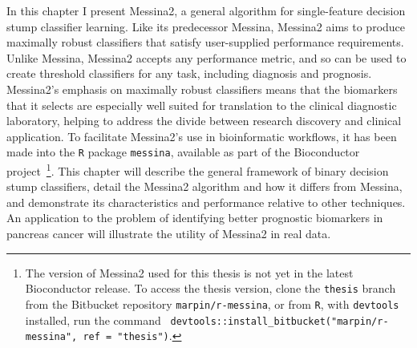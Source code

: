 \documentclass[dissertation.tex]{subfiles}
\begin{document}
In this chapter I present Messina2, a general algorithm for single-feature decision stump classifier learning.  Like its predecessor Messina, Messina2 aims to produce maximally robust classifiers that satisfy user-supplied performance requirements.  Unlike Messina, Messina2 accepts any performance metric, and so can be used to create threshold classifiers for any task, including diagnosis and prognosis.  Messina2's emphasis on maximally robust classifiers means that the biomarkers that it selects are especially well suited for translation to the clinical diagnostic laboratory, helping to address the divide between research discovery and clinical application.  To facilitate Messina2's use in bioinformatic workflows, it has been made into the \texttt{R} package \texttt{messina}, available as part of the Bioconductor project~\cite{Gentleman2004}\footnote{The version of Messina2 used for this thesis is not yet in the latest Bioconductor release.  To access the thesis version, clone the \texttt{thesis} branch from the Bitbucket repository \texttt{marpin/r-messina}, or from \texttt{R}, with \texttt{devtools} installed, run the command \texttt{ devtools::install\_bitbucket("marpin/r-messina", ref = "thesis")}.}.  This chapter will describe the general framework of binary decision stump classifiers, detail the Messina2 algorithm and how it differs from Messina, and demonstrate its characteristics and performance relative to other techniques.  An application to the problem of identifying better prognostic biomarkers in pancreas cancer will illustrate the utility of Messina2 in real data.
\end{document}
